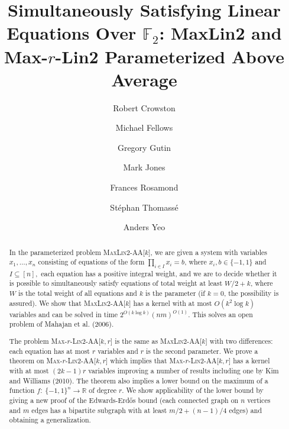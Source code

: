 \documentclass{llncs}
\begin{document}
\title{Simultaneously Satisfying Linear Equations Over $\mathbb{F}_2$: MaxLin2 and Max-$r$-Lin2 Parameterized Above Average}

\author{
Robert Crowston \and Michael Fellows \and Gregory Gutin \and Mark Jones
\and Frances Rosamond \and St{\'e}phan Thomass{\'e} \and Anders Yeo}

\date{}
\maketitle




\newenvironment{compress}{\baselineskip=10pt}{\par}
\begin{abstract}
\noindent
In the parameterized problem \textsc{MaxLin2-AA}[$k$], we are given a system with variables $x_1,\ldots ,x_n$
consisting of equations of the form $\prod_{i \in I}x_i = b$, where
$x_i,b \in \{-1, 1\}$ and $I\subseteq [n],$ each equation has a positive integral weight, and we are to decide
whether it is possible to simultaneously satisfy
equations of total weight at least $W/2+k$, where $W$ is the total weight of all equations and $k$ is the parameter
(if $k=0$, the possibility is assured).
We show that \textsc{MaxLin2-AA}[$k$] has a kernel with at most $O(k^2\log k)$ variables and can be solved in time
$2^{O(k\log k)}(nm)^{O(1)}$. This solves
an open problem of Mahajan et al. (2006).

The problem \textsc{Max-$r$-Lin2-AA}[$k,r$] is the same as \textsc{MaxLin2-AA}[$k$] with two differences:
each equation has at most $r$ variables and $r$ is the second parameter. We prove a theorem on
\textsc{Max-$r$-Lin2-AA}[$k,r$]
which implies that \textsc{Max-$r$-Lin2-AA}[$k,r$] has a kernel with at most $(2k-1)r$ variables
improving a number of results including
one by Kim and Williams (2010).  The theorem also implies a lower bound on the maximum of a
function $f:\ \{-1,1\}^n \rightarrow \mathbb{R}$
of degree $r$. We show applicability of the lower bound by
giving a new proof of the Edwards-Erd{\H o}s bound (each connected graph on $n$ vertices and $m$ edges
has a bipartite subgraph with at least $m/2 + (n-1)/4$ edges) and obtaining a generalization.
\end{abstract}
\end{document}
